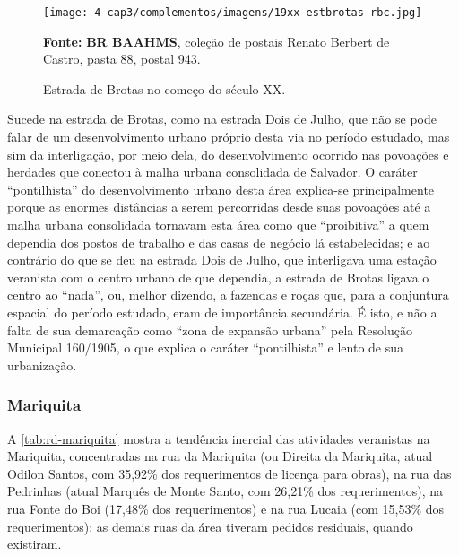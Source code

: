 \begin{figure}[!h]
\centering
\caption{Estrada de Brotas no começo do século XX.}
\texttt{[image: 4-cap3/complementos/imagens/19xx-estbrotas-rbc.jpg]}{\footnotesize \par \textbf{Fonte:} \textbf{BR BAAHMS}, coleção de postais Renato Berbert de Castro, pasta 88, postal 943.}
\label{fig:19xx-estbrotas-rbc}
\end{figure}

Sucede na estrada de Brotas, como na estrada Dois de Julho, que não se pode falar de um desenvolvimento urbano próprio desta via no período estudado, mas sim da interligação, por meio dela, do desenvolvimento ocorrido nas povoações e herdades que conectou à malha urbana consolidada de Salvador. O caráter ``pontilhista'' do desenvolvimento urbano desta área explica-se principalmente porque as enormes distâncias a serem percorridas desde suas povoações até a malha urbana consolidada tornavam esta área como que ``proibitiva'' a quem dependia dos postos de trabalho e das casas de negócio lá estabelecidas; e ao contrário do que se deu na estrada Dois de Julho, que interligava uma estação veranista com o centro urbano de que dependia, a estrada de Brotas ligava o centro ao ``nada'', ou, melhor dizendo, a fazendas e roças que, para a conjuntura espacial do período estudado, eram de importância secundária. É isto, e não a falta de sua demarcação como ``zona de expansão urbana'' pela Resolução Municipal 160/1905, o que explica o caráter ``pontilhista'' e lento de sua urbanização.

\subsubsection{Mariquita}


A \autoref{tab:rd-mariquita} mostra a tendência inercial das atividades veranistas na Mariquita, concentradas na rua da Mariquita (ou Direita da Mariquita, atual Odilon Santos, com 35,92\% dos requerimentos de licença para obras), na rua das Pedrinhas (atual Marquês de Monte Santo, com 26,21\% dos requerimentos), na rua Fonte do Boi (17,48\% dos requerimentos) e na rua Lucaia (com 15,53\% dos requerimentos); as demais ruas da área tiveram pedidos residuais, quando existiram.


